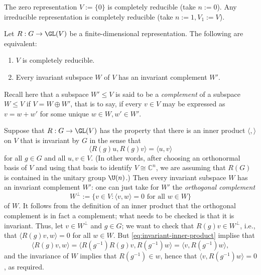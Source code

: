 \documentclass[reqno]{amsart} 
\begin{document}
\begin{example}
  The zero representation $V := \{0\}$ is completely reducible (take $n := 0$).
  Any irreducible representation is completely reducible (take $n := 1, V_1 := V$).
\end{example}
\begin{lemma}\label{lem:compl-red-vs-complements}
  Let $R : G \rightarrow \GL(V)$ be a finite-dimensional
  representation.
  The following are equivalent:
  \begin{enumerate}
  \item $V$ is completely reducible.
  \item Every invariant subspace $W$ of $V$ has an invariant
    complement $W'$.
  \end{enumerate}
\end{lemma}
Recall here
that a subspace $W' \leq V$ is said to be a \emph{complement}
of a subspace $W \leq V$ if
$V = W \oplus W'$, that is to say, if every
$v \in V$ may be expressed
as $v = w + w'$ for some unique $w \in W, w' \in W'$.

\begin{example}\label{example:invariant-inner-product-implies-complete-irreducibility}
  Suppose that $R : G \rightarrow \GL(V)$
  has the property that there is an inner product
  $\langle , \rangle$ on $V$
  that is invariant by $G$ in the sense that
  \begin{equation}\label{eq:invariant-inner-product}
    \langle R(g) u, R(g) v  \rangle = \langle u,v \rangle
  \end{equation}
  for all $g \in G$ and all $u, v \in V$.
  (In other words, after choosing an orthonormal basis of $V$ and using that basis to identify $V \cong
  \mathbb{C}^n$,
  we are assuming that $R(G)$ is contained in the unitary group $\U(n)$.)
  Then every invariant subspace $W$ has an invariant complement $W'$:
  one can just take for $W'$ the \emph{orthogonal complement}
  \begin{equation*}
    W^\perp := \{v \in V : \langle v,w \rangle = 0 \text{ for
 all }
w \in W\}
  \end{equation*}
  of
  $W$.
  It follows from the definition of an inner product that the orthogonal complement is in fact a complement;
  what needs to be checked
  is that it is invariant.
  Thus, let $v \in W^\perp$ and $g \in G$;
  we want to check that $R(g) v \in W^\perp$,
  i.e., that $\langle R(g) v, w \rangle = 0$
  for all $w \in W$.
  But \eqref{eq:invariant-inner-product} implise that
  \begin{equation*}
    \langle R(g) v, w \rangle = \langle R(g^{-1}) R(g) v,
    R(g^{-1}) w \rangle
    = \langle v, R(g^{-1}) w \rangle,
  \end{equation*}
  and the invariance of $W$ implies that $R(g^{-1}) \in w$,
  hence that
  $\langle v, R(g^{-1}) w \rangle= 0$,
  as required.
\end{example}
\end{document}
